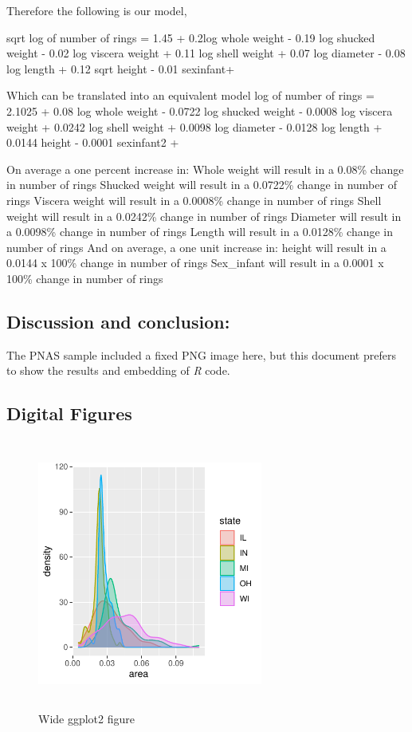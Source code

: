 \documentclass[letterpaper,9pt,twocolumn,twoside,]{pinp}
\begin{document}
Therefore the following is our model,

sqrt log of number of rings = 1.45 + 0.2log whole weight - 0.19 log
shucked weight - 0.02 log viscera weight + 0.11 log shell weight + 0.07
log diameter - 0.08 log length + 0.12 sqrt height - 0.01 sexinfant+

Which can be translated into an equivalent model log of number of rings
= 2.1025 + 0.08 log whole weight - 0.0722 log shucked weight - 0.0008
log viscera weight + 0.0242 log shell weight + 0.0098 log diameter -
0.0128 log length + 0.0144 height - 0.0001 sexinfant2 +

On average a one percent increase in: Whole weight will result in a
0.08\% change in number of rings Shucked weight will result in a
0.0722\% change in number of rings Viscera weight will result in a
0.0008\% change in number of rings Shell weight will result in a
0.0242\% change in number of rings Diameter will result in a 0.0098\%
change in number of rings Length will result in a 0.0128\% change in
number of rings And on average, a one unit increase in: height will
result in a 0.0144 x 100\% change in number of rings Sex\_infant will
result in a 0.0001 x 100\% change in number of rings

\hypertarget{discussion-and-conclusion}{%
\subsection{Discussion and
conclusion:}\label{discussion-and-conclusion}}

The PNAS sample included a fixed PNG image here, but this document
prefers to show the results and embedding of \emph{R} code.

\hypertarget{digital-figures}{%
\subsection{Digital Figures}\label{digital-figures}}

\begin{figure}
  \begin{center}
    \includegraphics[width=0.66\textwidth, height=3.5in]{densities} 
  \end{center}
  \caption{Wide ggplot2 figure}\label{fig}
\end{figure}
\end{document}
